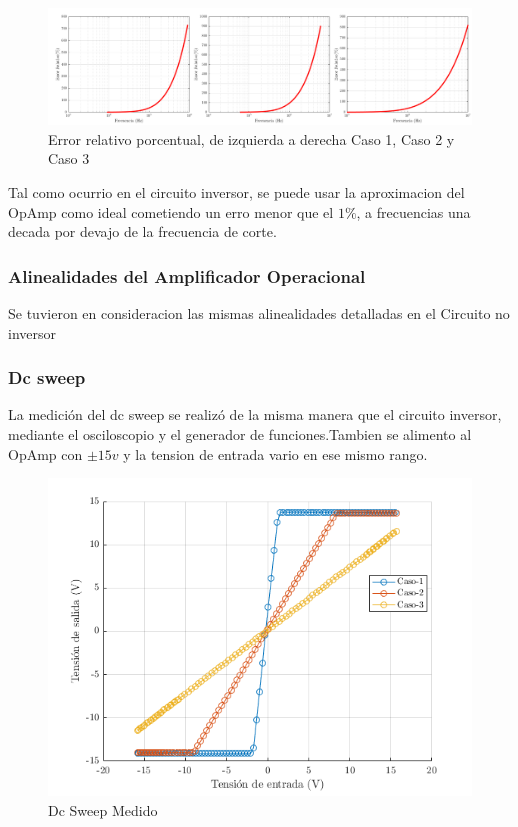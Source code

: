 \documentclass[../../main.tex]{subfiles}
\begin{document}
\begin{figure}[H]
\centering
\includegraphics[width=1\textwidth]{error_n}
\caption{Error relativo porcentual, de izquierda a derecha Caso 1, Caso 2 y Caso 3} \label{fig=errorn}
\end{figure}

Tal como ocurrio en el circuito inversor, se puede usar la aproximacion del OpAmp como ideal cometiendo un erro menor que el $1\%$, a frecuencias una decada por devajo de la frecuencia de corte.



\subsubsection{Alinealidades del Amplificador Operacional}
Se tuvieron en consideracion las mismas alinealidades detalladas en el Circuito no inversor
\subsubsection{Dc sweep}
La medición del dc sweep se realizó de la misma manera que el circuito inversor, mediante el osciloscopio y el generador de funciones.Tambien se alimento al OpAmp con $\pm 15 v$ y la tension de entrada vario en ese mismo rango.

\begin{figure}[H]
\centering
\includegraphics[width=1\textwidth]{dc_sweep_n}
\caption{Dc Sweep Medido} \label{fig=dcn}
\end{figure}
\end{document}
